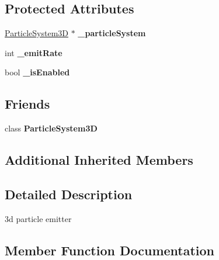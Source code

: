 \subsection*{Protected Attributes}
\begin{DoxyCompactItemize}
\item 
\mbox{\label{classParticle3DEmitter_afe79c7c4bbd19c473728d74e482bf1ce}} 
\hyperlink{classParticleSystem3D}{Particle\+System3D} $\ast$ {\bfseries \+\_\+particle\+System}
\item 
\mbox{\label{classParticle3DEmitter_a70114b34bc7688c55c6445ea2be37b1d}} 
int {\bfseries \+\_\+emit\+Rate}
\item 
\mbox{\label{classParticle3DEmitter_af2c3c7d6035005813970052e0fd5bc78}} 
bool {\bfseries \+\_\+is\+Enabled}
\end{DoxyCompactItemize}
\subsection*{Friends}
\begin{DoxyCompactItemize}
\item 
\mbox{\label{classParticle3DEmitter_a372ad87c704d67c7a8060c019dba790b}} 
class {\bfseries Particle\+System3D}
\end{DoxyCompactItemize}
\subsection*{Additional Inherited Members}


\subsection{Detailed Description}
3d particle emitter 

\subsection{Member Function Documentation}
\mbox{\label{classParticle3DEmitter_a98b31fc2e14b4a86788c923d773d0caa}} 
